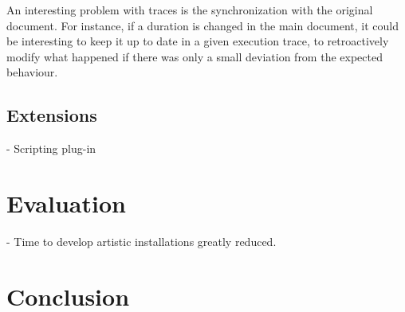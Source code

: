 \documentclass{sigchi}
\begin{document}
An interesting problem with traces is the synchronization with the original document. For instance, if a duration is changed in the main document, it could be interesting to keep it up to date in a given execution trace, to retroactively modify what happened if there was only a small deviation from the expected behaviour.


\subsection{Extensions}
- Scripting plug-in

\section{Evaluation}
- Time to develop artistic installations greatly reduced.

\section{Conclusion}



\end{document}
